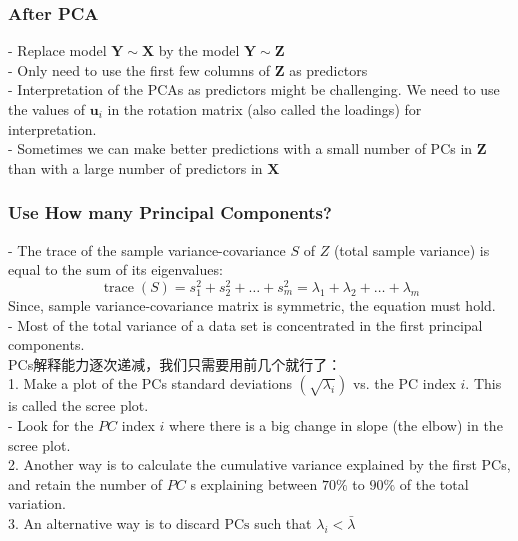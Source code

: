 \documentclass[11pt,a4paper]{article}
\begin{document}
\subsubsection{After PCA}
- Replace model $\mathbf{Y} \sim \mathbf{X}$ by the model $\mathbf{Y} \sim \mathbf{Z}$\\
- Only need to use the first few columns of $\mathbf{Z}$ as predictors\\
- Interpretation of the PCAs as predictors might be challenging. We need to use the values of $\mathbf{u}_{i}$ in the rotation matrix (also called the loadings) for interpretation.\\
- Sometimes we can make better predictions with a small number of PCs in $\mathbf{Z}$ than with a large number of predictors in $\mathbf{X}$\\

\subsubsection{Use How many Principal Components?}
- The trace of the sample variance-covariance $S$ of $Z$ (total sample variance) is equal to the sum of its eigenvalues:
$$
\operatorname{trace}(S)=s_{1}^{2}+s_{2}^{2}+\ldots+s_{m}^{2}=\lambda_{1}+\lambda_{2}+\ldots+\lambda_{m}
$$
Since, sample variance-covariance matrix is symmetric, the equation must hold.\\
- Most of the total variance of a data set is concentrated in the first principal components.\\
PCs解释能力逐次递减，我们只需要用前几个就行了：\\
1. Make a plot of the PCs standard deviations $\left(\sqrt{\lambda_{i}}\right)$ vs. the PC index $i$. This is called the scree plot.\\
- Look for the $P C$ index $i$ where there is a big change in slope (the elbow) in the scree plot.\\
2. Another way is to calculate the cumulative variance explained by the first PCs, and retain the number of $P C$ s explaining between $70 \%$ to $90 \%$ of the total variation.\\
3. An alternative way is to discard $\mathrm{PCs}$ such that $\lambda_{i}<\bar{\lambda}$
\end{document}
